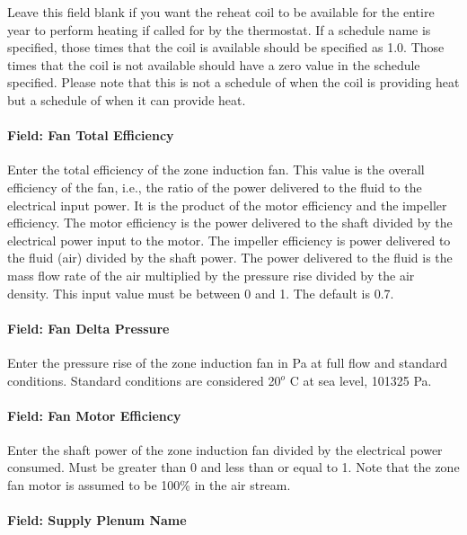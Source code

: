 Leave this field blank if you want the reheat coil to be available for the entire year to perform heating if called for by the thermostat. If a schedule name is specified, those times that the coil is available should be specified as 1.0. Those times that the coil is not available should have a zero value in the schedule specified. Please note that this is not a schedule of when the coil is providing heat but a schedule of when it can provide heat.

\paragraph{Field: Fan Total Efficiency}\label{field-fan-total-efficiency-001}

Enter the total efficiency of the zone induction fan. This value is the overall efficiency of the fan, i.e., the ratio of the power delivered to the fluid to the electrical input power. It is the product of the motor efficiency and the impeller efficiency. The motor efficiency is the power delivered to the shaft divided by the electrical power input to the motor. The impeller efficiency is power delivered to the fluid (air) divided by the shaft power. The power delivered to the fluid is the mass flow rate of the air multiplied by the pressure rise divided by the air density. This input value must be between 0 and 1. The default is 0.7.

\paragraph{Field: Fan Delta Pressure}\label{field-fan-delta-pressure}

Enter the pressure rise of the zone induction fan in Pa at full flow and standard conditions. Standard conditions are considered 20\(^{o}\) C at sea level, 101325 Pa.

\paragraph{Field: Fan Motor Efficiency}\label{field-fan-motor-efficiency}

Enter the shaft power of the zone induction fan divided by the electrical power consumed. Must be greater than 0 and less than or equal to 1. Note that the zone fan motor is assumed to be 100\% in the air stream.

\paragraph{Field: Supply Plenum Name}\label{field-supply-plenum-name-2}

